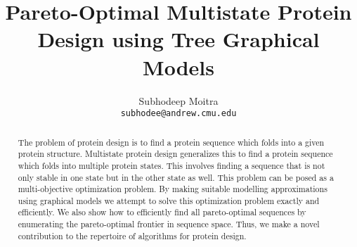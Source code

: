 \documentclass{article}
\begin{document}
\title{Pareto-Optimal Multistate Protein Design using Tree Graphical Models}
\author{Subhodeep Moitra \\ {\tt subhodee@andrew.cmu.edu}}

\maketitle

\begin{abstract}
The problem of protein design is to find a protein sequence which folds into a given protein structure. Multistate protein design generalizes this to find a protein sequence which folds into multiple protein states. This involves finding a sequence that is not only stable in one state but in the other state as well. This problem can be posed as a multi-objective optimization problem. By making suitable modelling approximations using graphical models we attempt to solve this optimization problem exactly and efficiently. We also show how to efficiently find all pareto-optimal sequences by enumerating the pareto-optimal frontier in sequence space. Thus, we make a novel contribution to the repertoire of algorithms for protein design. 
\end{abstract}
\end{document}
